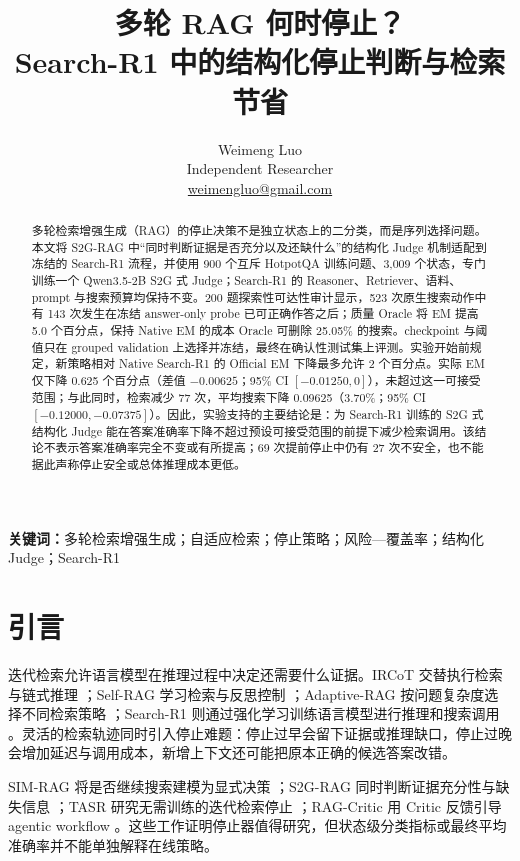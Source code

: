 \documentclass[UTF8,fontset=fandol,11pt,a4paper]{ctexart}
\title{多轮 RAG 何时停止？\\Search-R1 中的结构化停止判断与检索节省}
\author{Weimeng Luo\\
\small Independent Researcher\\
\small \href{mailto:weimengluo@gmail.com}{weimengluo@gmail.com}}
\date{}
\begin{document}
\maketitle

\begin{abstract}
多轮检索增强生成（RAG）的停止决策不是独立状态上的二分类，而是序列选择问题。本文将 S2G-RAG 中“同时判断证据是否充分以及还缺什么”的结构化 Judge 机制适配到冻结的 Search-R1 流程，并使用 900 个互斥 HotpotQA 训练问题、3,009 个状态，专门训练一个 Qwen3.5-2B S2G 式 Judge；Search-R1 的 Reasoner、Retriever、语料、prompt 与搜索预算均保持不变。200 题探索性可达性审计显示，523 次原生搜索动作中有 143 次发生在冻结 answer-only probe 已可正确作答之后；质量 Oracle 将 EM 提高 5.0 个百分点，保持 Native EM 的成本 Oracle 可删除 25.05\% 的搜索。checkpoint 与阈值只在 grouped validation 上选择并冻结，最终在确认性测试集上评测。实验开始前规定，新策略相对 Native Search-R1 的 Official EM 下降最多允许 2 个百分点。实际 EM 仅下降 0.625 个百分点（差值 $-0.00625$；95\% CI $[-0.01250,0]$），未超过这一可接受范围；与此同时，检索减少 77 次，平均搜索下降 0.09625（3.70\%；95\% CI $[-0.12000,-0.07375]$）。因此，实验支持的主要结论是：为 Search-R1 训练的 S2G 式结构化 Judge 能在答案准确率下降不超过预设可接受范围的前提下减少检索调用。该结论不表示答案准确率完全不变或有所提高；69 次提前停止中仍有 27 次不安全，也不能据此声称停止安全或总体推理成本更低。
\end{abstract}

\noindent\textbf{关键词：}多轮检索增强生成；自适应检索；停止策略；风险—覆盖率；结构化 Judge；Search-R1

\section{引言}

迭代检索允许语言模型在推理过程中决定还需要什么证据。IRCoT 交替执行检索与链式推理 \citep{trivedi2023ircot}；Self-RAG 学习检索与反思控制 \citep{asai2023selfrag}；Adaptive-RAG 按问题复杂度选择不同检索策略 \citep{jeong2024adaptiverag}；Search-R1 则通过强化学习训练语言模型进行推理和搜索调用 \citep{jin2025searchr1}。灵活的检索轨迹同时引入停止难题：停止过早会留下证据或推理缺口，停止过晚会增加延迟与调用成本，新增上下文还可能把原本正确的候选答案改错。

SIM-RAG 将是否继续搜索建模为显式决策 \citep{yang2025simrag}；S2G-RAG 同时判断证据充分性与缺失信息 \citep{li2026s2grag}；TASR 研究无需训练的迭代检索停止 \citep{kieback2026tasr}；RAG-Critic 用 Critic 反馈引导 agentic workflow \citep{dong2025ragcritic}。这些工作证明停止器值得研究，但状态级分类指标或最终平均准确率并不能单独解释在线策略。
\end{document}
